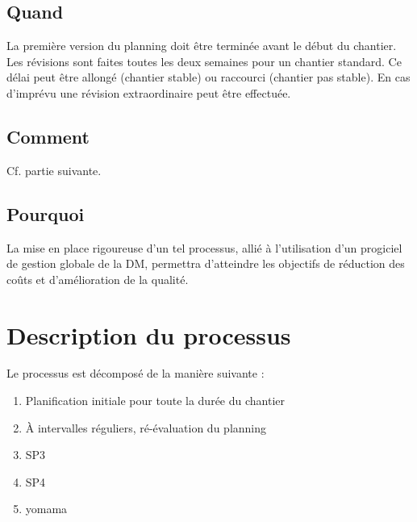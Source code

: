 \documentclass[a4paper]{article}
\begin{document}
\subsection*{Quand}
La première version du planning doit être terminée avant le début du
chantier. Les révisions sont faites toutes les deux semaines pour un
chantier standard. Ce délai peut être allongé (chantier stable) ou
raccourci (chantier pas stable). En cas d'imprévu une révision
extraordinaire peut être effectuée.

\subsection*{Comment}
Cf. partie suivante.

\subsection*{Pourquoi}
La mise en place rigoureuse d'un tel processus, allié à l'utilisation d'un
progiciel de gestion globale de la DM, permettra d'atteindre les objectifs
de réduction des coûts et d'amélioration de la qualité.

\section{Description du processus}

Le processus est décomposé de la manière suivante :
\begin{enumerate}
\item Planification initiale pour toute la durée du chantier
\item À intervalles réguliers, ré-évaluation du planning
\item SP3
\item SP4
\item yomama
\end{enumerate}
\end{document}
